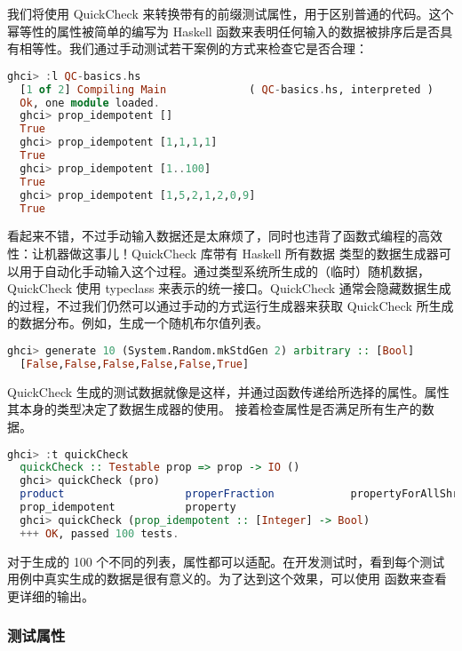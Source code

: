 \documentclass[./main.tex]{subfiles}
\begin{document}
我们将使用 QuickCheck 来转换带有的前缀测试属性，用于区别普通的代码。这个幂等性的属性被简单的编写为 Haskell
函数来表明任何输入的数据被排序后是否具有相等性。我们通过手动测试若干案例的方式来检查它是否合理：

\begin{lstlisting}[language=Haskell]
  ghci> :l QC-basics.hs
  [1 of 2] Compiling Main             ( QC-basics.hs, interpreted )
  Ok, one module loaded.
  ghci> prop_idempotent []
  True
  ghci> prop_idempotent [1,1,1,1]
  True
  ghci> prop_idempotent [1..100]
  True
  ghci> prop_idempotent [1,5,2,1,2,0,9]
  True
\end{lstlisting}

看起来不错，不过手动输入数据还是太麻烦了，同时也违背了函数式编程的高效性：让机器做这事儿！QuickCheck 库带有 Haskell 所有数据
类型的数据生成器可以用于自动化手动输入这个过程。通过类型系统所生成的（临时）随机数据，QuickCheck 使用
typeclass 来表示的统一接口。QuickCheck 通常会隐藏数据生成的过程，不过我们仍然可以通过手动的方式运行生成器来获取 QuickCheck
所生成的数据分布。例如，生成一个随机布尔值列表。


\begin{lstlisting}[language=Haskell]
  ghci> generate 10 (System.Random.mkStdGen 2) arbitrary :: [Bool]
  [False,False,False,False,False,True]
\end{lstlisting}

QuickCheck 生成的测试数据就像是这样，并通过函数传递给所选择的属性。属性其本身的类型决定了数据生成器的使用。
接着检查属性是否满足所有生产的数据。

\begin{lstlisting}[language=Haskell]
  ghci> :t quickCheck
  quickCheck :: Testable prop => prop -> IO ()
  ghci> quickCheck (pro)
  product                   properFraction            propertyForAllShrinkShow
  prop_idempotent           property
  ghci> quickCheck (prop_idempotent :: [Integer] -> Bool)
  +++ OK, passed 100 tests.
\end{lstlisting}

对于生成的 100 个不同的列表，属性都可以适配。在开发测试时，看到每个测试用例中真实生成的数据是很有意义的。为了达到这个效果，可以使用
函数来查看更详细的输出。

\subsubsection*{测试属性}
\end{document}
